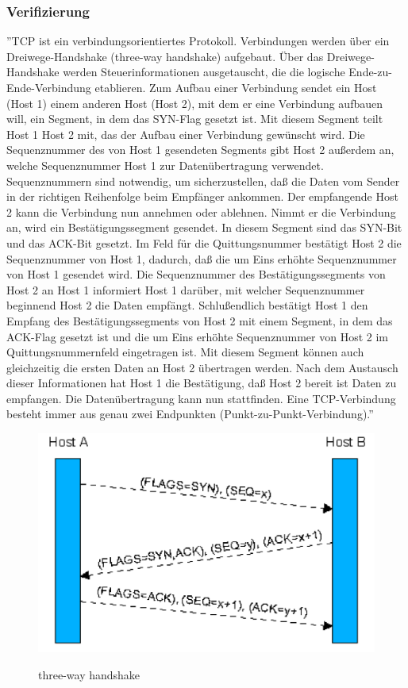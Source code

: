 \subsubsection{Verifizierung}
''TCP ist ein verbindungsorientiertes Protokoll. Verbindungen werden über ein Dreiwege-Handshake (three-way handshake) aufgebaut. Über das Dreiwege-Handshake werden Steuerinformationen ausgetauscht, die die logische Ende-zu-Ende-Verbindung etablieren. Zum Aufbau einer Verbindung sendet ein Host (Host 1) einem anderen Host (Host 2), mit dem er eine Verbindung aufbauen will, ein Segment, in dem das SYN-Flag gesetzt ist. Mit diesem Segment teilt Host 1 Host 2 mit, das der Aufbau einer Verbindung gewünscht wird. Die Sequenznummer des von Host 1 gesendeten Segments gibt Host 2 außerdem an, welche Sequenznummer Host 1 zur Datenübertragung verwendet. Sequenznummern sind notwendig, um sicherzustellen, daß die Daten vom Sender in der richtigen Reihenfolge beim Empfänger ankommen. Der empfangende Host 2 kann die Verbindung nun annehmen oder ablehnen. Nimmt er die Verbindung an, wird ein Bestätigungssegment gesendet. In diesem Segment sind das SYN-Bit und das ACK-Bit gesetzt. Im Feld für die Quittungsnummer bestätigt Host 2 die Sequenznummer von Host 1, dadurch, daß die um Eins erhöhte Sequenznummer von Host 1 gesendet wird. Die Sequenznummer des Bestätigungssegments von Host 2 an Host 1 informiert Host 1 darüber, mit welcher Sequenznummer beginnend Host 2 die Daten empfängt. Schlußendlich bestätigt Host 1 den Empfang des Bestätigungssegments von Host 2 mit einem Segment, in dem das ACK-Flag gesetzt ist und die um Eins erhöhte Sequenznummer von Host 2 im Quittungsnummernfeld eingetragen ist. Mit diesem Segment können auch gleichzeitig die ersten Daten an Host 2 übertragen werden. Nach dem Austausch dieser Informationen hat Host 1 die Bestätigung, daß Host 2 bereit ist Daten zu empfangen. Die Datenübertragung kann nun stattfinden. Eine TCP-Verbindung besteht immer aus genau zwei Endpunkten (Punkt-zu-Punkt-Verbindung).'' \cite{noauthor_einfuhrung_nodate}
\begin{figure}
\begin{center}
    \includegraphics[scale=0.35]{images/ThreeWayHandshake.png} 
\end{center}
    \caption{three-way handshake}
    \label{img:three-way handshake}
    \cite{noauthor_einfuhrung_nodate}
\end{figure}

